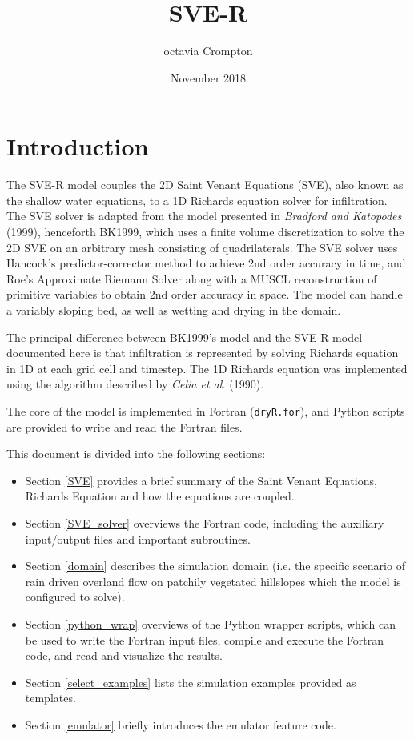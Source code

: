 \documentclass{article}
\title{SVE-R}
\author{octavia Crompton}
\date{November 2018}
\newcommand{\code}[1]{\texttt{#1}}
\begin{document}
\tableofcontents		

\section{Introduction}

The SVE-R model couples the 2D Saint Venant Equations (SVE), also known as the shallow water equations, to a 1D Richards equation solver for infiltration.  The SVE solver is adapted from the model presented in \textit{Bradford and Katopodes} (1999), henceforth BK1999, which uses a finite volume discretization to solve the 2D SVE on an arbitrary mesh consisting of quadrilaterals.   The SVE solver uses Hancock's predictor-corrector method  to achieve 2nd order accuracy in time, and Roe's Approximate Riemann Solver along with a MUSCL reconstruction of primitive variables to obtain 2nd order accuracy in space.   The model can handle a variably sloping bed, as well as wetting and drying in the domain.

The principal difference between  BK1999's model and the SVE-R model documented here is that infiltration is represented by solving Richards equation in 1D at each grid cell and timestep.  The 1D Richards equation was implemented using the algorithm described by  \textit{Celia et al.} (1990).  


The core of the model is implemented in Fortran  (\code{dryR.for}), and Python scripts are provided to write and read the Fortran files.
  
This document is divided into the following sections:

\begin{itemize}
	\item Section \ref{SVE} provides a brief summary of the Saint Venant Equations, Richards Equation and how the equations are coupled.
	\item Section \ref{SVE_solver} overviews the Fortran code, including the  auxiliary input/output files and important subroutines.
	\item Section \ref{domain} describes the simulation domain (i.e. the specific scenario of rain driven overland flow on patchily vegetated hillslopes which the model is configured to solve).
	\item  Section \ref{python_wrap} overviews of the Python wrapper scripts,  which can be used to write the Fortran input files, compile and execute the Fortran code, and read and visualize the results.
	\item Section \ref{select_examples} lists the simulation examples provided as templates.
	\item Section \ref{emulator} briefly introduces the emulator feature code.
\end{itemize}		  
\end{document}
